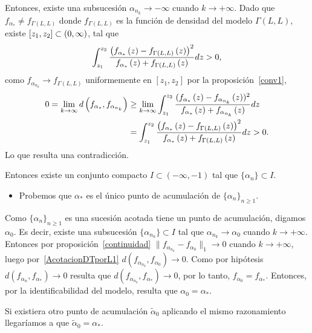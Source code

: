 \begin{dem}
\begin{itemize}
\begin{enumerate}[(i)]
			Entonces, existe una subsucesión $\alpha_{n_{k}} \to -\infty$ cuando $k \to +\infty$. Dado que $f_{\alpha_{*}}\ne f_{\Gamma(L,L)}$ donde $f_{\Gamma(L,L)}$ es la función de densidad del modelo $\Gamma(L,L)$, existe $[z_{1},z_{2}]\subset\left( 0,\infty \right)$, tal que
			\begin{align*}
			\int_{z_{1}}^{z_{2}}\frac{\left( f_{\alpha_{*}}\left( z \right)-f_{\Gamma(L,L)}\left( z \right) \right)^{2}}
			{f_{\alpha_{*}}\left( z \right)+f_{\Gamma(L,L)}\left( z \right)}dz >0,
			\end{align*}
			como $f_{\alpha_{n_{k}}} \to f_{\Gamma(L,L)}$ uniformemente en $[z_{1},z_{2}]$ por la proposición~\ref{conv1}, 
			\begin{align*}
			0=\lim_{k\to\infty} d\left( f_{\alpha_{*}}, f_{\alpha_{n_{k}}} \right) 
			& \ge \lim_{k\to\infty}  \int_{z_{1}}^{z_{2}}\frac{(f_{\alpha_{*}}\left( z \right)-f_{\alpha_{n_{k}}}\left( z \right))^{2}}
			{f_{\alpha_{*}}\left( z \right) + f_{\alpha_{n_{k}}}\left( z \right)}dz \\
			& = \int_{z_{1}}^{z_{2}}\frac{\left( f_{\alpha_{*}}\left( z \right)-f_{\Gamma(L,L)}\left( z \right) \right)^{2}}
			{f_{\alpha_{*}}\left( z \right)+f_{\Gamma(L,L)}\left( z \right)}dz >0.
			\end{align*}
			Lo que resulta una contradicción.
		\end{enumerate}
		Entonces existe un conjunto compacto $I \subset (-\infty,-1)$ tal que $\{\alpha_{n}\} \subset I$.
	\end{itemize}
	
	\begin{itemize}
		\item Probemos que $\alpha_*$ es el único punto de acumulación de $\{\alpha_{n}\}_{n \ge 1}$.
	\end{itemize}
	
	Como $\{\alpha_{n}\}_{n \ge 1}$ es una sucesión acotada tiene un punto de acumulación, digamos $\alpha_0$. Es decir, existe una subsucesión $\{\alpha_{n_{k}}\} \subset I$ tal que $\alpha_{n_{k}} \to \alpha_{0}$ cuando $k \to +\infty$. Entonces por proposición~\ref{continuidad} $\parallel f_{\alpha_{n_{k}}} - f_{\alpha_{0}}\parallel_{1} \to 0$ cuando $k \to +\infty$, luego por~\eqref{AcotacionDTporL1} $d(f_{\alpha_{n_k}},f_{\alpha_0}) \to 0$. Como por hipótesis $d(f_{\alpha_{n}},f_{\alpha_*}) \to 0$ resulta que $d(f_{\alpha_{n_k}},f_{\alpha_*}) \to 0$, por lo tanto, $f_{\alpha_0} = f_{\alpha_*}$. Entonces, por la identificabilidad del modelo, resulta que $\alpha_0=\alpha_*$.
	
	Si existiera otro punto de acumulación $\tilde{\alpha}_0$ aplicando el mismo razonamiento llegaríamos a que $\tilde{\alpha}_0=\alpha_*$.
	

\end{dem}
